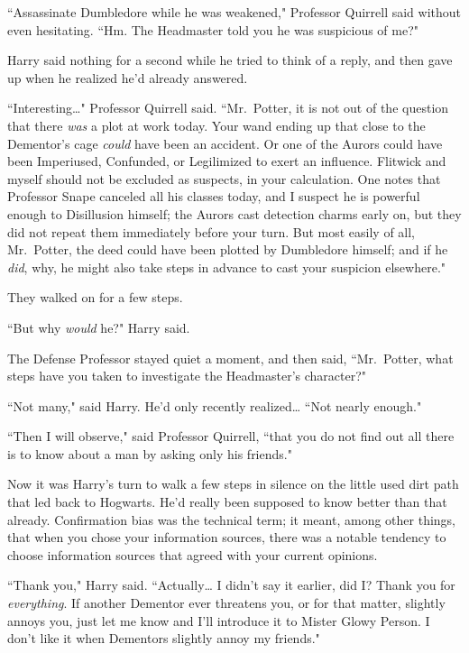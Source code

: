 ``Assassinate Dumbledore while he was weakened," Professor Quirrell said without even hesitating. ``Hm. The Headmaster told you he was suspicious of me?"

Harry said nothing for a second while he tried to think of a reply, and then gave up when he realized he'd already answered.

``Interesting{\ldots}" Professor Quirrell said. ``Mr.~Potter, it is not out of the question that there \emph{was} a plot at work today. Your wand ending up that close to the Dementor's cage \emph{could} have been an accident. Or one of the Aurors could have been Imperiused, Confunded, or Legilimized to exert an influence. Flitwick and myself should not be excluded as suspects, in your calculation. One notes that Professor Snape canceled all his classes today, and I suspect he is powerful enough to Disillusion himself; the Aurors cast detection charms early on, but they did not repeat them immediately before your turn. But most easily of all, Mr.~Potter, the deed could have been plotted by Dumbledore himself; and if he \emph{did}, why, he might also take steps in advance to cast your suspicion elsewhere."

They walked on for a few steps.

``But why \emph{would} he?" Harry said.

The Defense Professor stayed quiet a moment, and then said, ``Mr.~Potter, what steps have you taken to investigate the Headmaster's character?"

``Not many," said Harry. He'd only recently realized{\ldots} ``Not nearly enough."

``Then I will observe," said Professor Quirrell, ``that you do not find out all there is to know about a man by asking only his friends."

Now it was Harry's turn to walk a few steps in silence on the little used dirt path that led back to Hogwarts. He'd really been supposed to know better than that already. Confirmation bias was the technical term; it meant, among other things, that when you chose your information sources, there was a notable tendency to choose information sources that agreed with your current opinions.

``Thank you," Harry said. ``Actually{\ldots} I didn't say it earlier, did I? Thank you for \emph{everything}. If another Dementor ever threatens you, or for that matter, slightly annoys you, just let me know and I'll introduce it to Mister Glowy Person. I don't like it when Dementors slightly annoy my friends."

